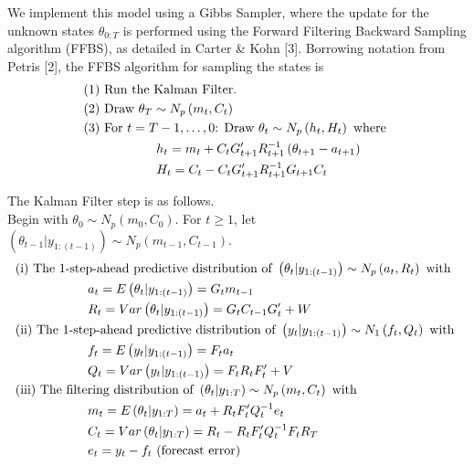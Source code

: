 \documentclass{article}
\begin{document}
We implement this model using a Gibbs Sampler, where the update for the unknown states $\theta_{0:T}$ is performed using the Forward Filtering Backward Sampling algorithm (FFBS), as detailed in Carter \& Kohn [3].  Borrowing notation from Petris [2], the FFBS algorithm for sampling the states is
\begin{align*}
	& \text{(1) Run the Kalman Filter.} \\
	& \text{(2) Draw } \theta_T \sim N_p\left(m_t, C_t \right) \\
	& \text{(3) For } t = T-1, \hdots, 0 \text{: Draw } \theta_t \sim N_p\left(h_t, H_t \right) \text{ where }\\
	& \hspace{2 cm} h_t = m_t + C_t G_{t+1}' R_{t+1} ^{-1} \left(\theta_{t+1} - a_{t+1} \right) \\
	& \hspace{2 cm} H_t = C_t - C_t G_{t+1}' R_{t+1} ^{-1} G_{t+1} C_t
\end{align*}

The Kalman Filter step is as follows. \\

Begin with $\theta_0 \sim N_p\left(m_0, C_0 \right)$. For $t \geq 1$, let $\left(\theta_{t-1} | y_{1:(t-1)} \right) \sim N_p\left(m_{t-1}, C_{t-1} \right)$.
\begin{align*}
	& \text{(i) The 1-step-ahead predictive distribution of } 
		\left(\theta_t | y_{1:(t-1)} \right) \sim N_p\left(a_t, R_t \right) \text{ with } \\
	&\hspace{2 cm} a_t = E\left(\theta_t | y_{1:(t-1)} \right) = G_t m_{t-1} \\
	&\hspace{2 cm} R_t = Var\left(\theta_t | y_{1:(t-1)} \right) = G_t C_{t-1}G_t' + W \\
	& \text{(ii) The 1-step-ahead predictive distribution of } \left( y_t | y_{1:(t-1)}\right) 
		\sim N_1\left(f_t, Q_t \right) \text{ with } \\
	&\hspace{2 cm} f_t = E\left(y_t | y_{1:(t-1)} \right) = F_t a_t \\
	&\hspace{2 cm} Q_t = Var\left(y_t | y_{1:(t-1)} \right) = F_t R_t F_t' + V \\
	& \text{(iii) The filtering distribution of } \left(\theta_t | y_{1:T} \right) \sim N_p\left(m_t, C_t \right) \text{ with } \\
	&\hspace{2 cm} m_t = E\left(\theta_t | y_{1:T} \right) = a_t + R_t F_t' Q_t ^{-1} e_t \\
	&\hspace{2 cm} C_t = Var\left(\theta_t | y_{1:T} \right) = R_t - R_t F_t' Q_t ^{-1} F_t R_T \\
	&\hspace{2 cm} e_t = y_t - f_t \text{ (forecast error)}
\end{align*}
\end{document}
